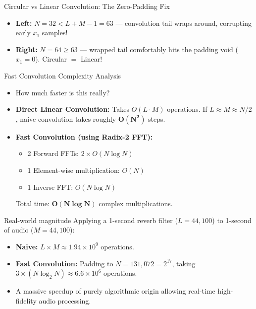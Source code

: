 \begin{frame}{Circular vs Linear Convolution: The Zero-Padding Fix}
\begin{center}
{
        }
    \end{center}
    \vspace{-0.2cm}
    \begin{itemize}
        \item \textbf{Left:} $N=32 < L+M-1=63$ — convolution tail wraps around, corrupting early $x_1$ samples!
        \item \textbf{Right:} $N=64 \ge 63$ — wrapped tail comfortably hits the padding void ($x_1=0$). Circular $=$ Linear!
    \end{itemize}
\end{frame}

\begin{frame}{Fast Convolution Complexity Analysis}
    \begin{itemize}
        \item How much faster is this really?
        \item \textbf{Direct Linear Convolution:} Takes $O(L \cdot M)$ operations.
              If $L \approx M \approx N/2$, naive convolution takes roughly $\mathbf{O(N^2)}$ steps.
        \item \textbf{Fast Convolution (using Radix-2 FFT):}
              \begin{itemize}
                  \item 2 Forward FFTs: $2 \times O(N \log N)$
                  \item 1 Element-wise multiplication: $O(N)$
                  \item 1 Inverse FFT: $O(N \log N)$
              \end{itemize}
              Total time: $\mathbf{O(N \log N)}$ complex multiplications.
    \end{itemize}
    \begin{insightbox}{Real-world magnitude}
        Applying a 1-second reverb filter ($L = 44,100$) to 1-second of audio ($M = 44,100$):
        \begin{itemize}
            \item \textbf{Naive:} $L \times M \approx 1.94 \times 10^9$ operations.
            \item \textbf{Fast Convolution:} Padding to $N = 131,072 = 2^{17}$, taking $3 \times (N \log_2 N) \approx 6.6 \times 10^6$ operations.
            \item A massive speedup of purely algorithmic origin allowing real-time high-fidelity audio processing.
        \end{itemize}
    \end{insightbox}
\end{frame}

